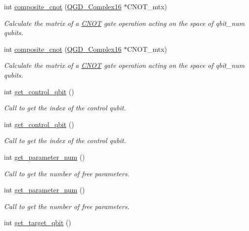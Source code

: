 \begin{DoxyCompactItemize}
int \hyperlink{class_c_n_o_t_aa74f9591e9746edde94c491a3f425315}{composite\+\_\+cnot} (\hyperlink{struct_q_g_d___complex16}{Q\+G\+D\+\_\+\+Complex16} $\ast$C\+N\+O\+T\+\_\+mtx)
\begin{DoxyCompactList}\small\item\em Calculate the matrix of a \hyperlink{class_c_n_o_t}{C\+N\+OT} gate operation acting on the space of qbit\+\_\+num qubits. \end{DoxyCompactList}\item 
int \hyperlink{class_c_n_o_t_aa74f9591e9746edde94c491a3f425315}{composite\+\_\+cnot} (\hyperlink{struct_q_g_d___complex16}{Q\+G\+D\+\_\+\+Complex16} $\ast$C\+N\+O\+T\+\_\+mtx)
\begin{DoxyCompactList}\small\item\em Calculate the matrix of a \hyperlink{class_c_n_o_t}{C\+N\+OT} gate operation acting on the space of qbit\+\_\+num qubits. \end{DoxyCompactList}\item 
int \hyperlink{class_operation_a2e9b60d334a0e0c99dede014ac989d0a}{get\+\_\+control\+\_\+qbit} ()
\begin{DoxyCompactList}\small\item\em Call to get the index of the control qubit. \end{DoxyCompactList}\item 
int \hyperlink{class_operation_a2e9b60d334a0e0c99dede014ac989d0a}{get\+\_\+control\+\_\+qbit} ()
\begin{DoxyCompactList}\small\item\em Call to get the index of the control qubit. \end{DoxyCompactList}\item 
int \hyperlink{class_operation_a670c1149cd1c675cf67bbcd861817223}{get\+\_\+parameter\+\_\+num} ()
\begin{DoxyCompactList}\small\item\em Call to get the number of free parameters. \end{DoxyCompactList}\item 
int \hyperlink{class_operation_a670c1149cd1c675cf67bbcd861817223}{get\+\_\+parameter\+\_\+num} ()
\begin{DoxyCompactList}\small\item\em Call to get the number of free parameters. \end{DoxyCompactList}\item 
int \hyperlink{class_operation_a55eee2ad4b90be085b1ec2ce018502f8}{get\+\_\+target\+\_\+qbit} ()

\end{DoxyCompactItemize}
